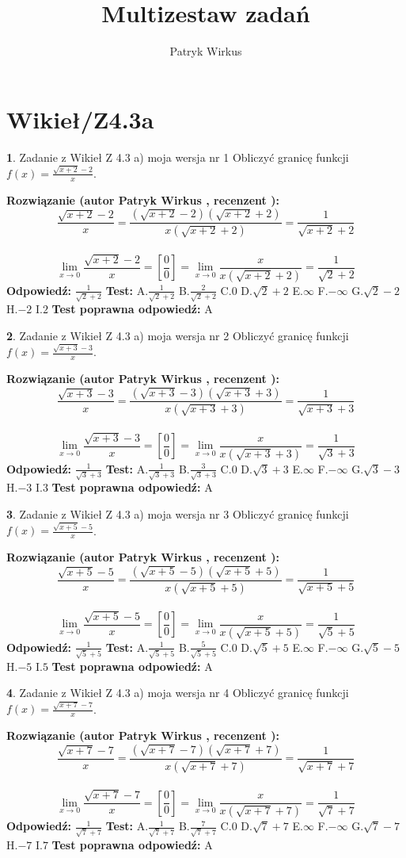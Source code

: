\documentclass[12pt, a4paper]{article}
\title{Multizestaw zadań}
\author{Patryk Wirkus}
\date{}
\theoremstyle{definition} %
\newtheorem{zad}{}
\newcommand{\kategoria}[1]{\section{#1}}
\newcommand{\zadStart}[1]{\begin{zad}#1\newline}
\newcommand{\zadStop}{\end{zad}}
\newcommand{\rozwStart}[2]{\noindent \textbf{Rozwiązanie (autor #1 , recenzent #2): }\newline}
\newcommand{\rozwStop}{\newline}
\newcommand{\odpStart}{\noindent \textbf{Odpowiedź:}\newline}
\newcommand{\odpStop}{\newline}
\newcommand{\testStart}{\noindent \textbf{Test:}\newline}
\newcommand{\testStop}{\newline}
\newcommand{\kluczStart}{\noindent \textbf{Test poprawna odpowiedź:}\newline}
\newcommand{\kluczStop}{\newline}
\begin{document}
\maketitle

\kategoria{Wikieł/Z4.3a}


\zadStart{Zadanie z Wikieł Z 4.3 a) moja wersja nr 1}
Obliczyć granicę funkcji $f(x)=\frac{\sqrt{x+2}-2}{x}$.
\zadStop
\rozwStart{Patryk Wirkus}{}
$$\frac{\sqrt{x+2}-2}{x}=\frac{(\sqrt{x+2}-2)(\sqrt{x+2}+2)}{x(\sqrt{x+2}+2)}=\frac{1}{\sqrt{x+2}+2}$$
\\
$$\lim\limits_{x\to0}\frac{\sqrt{x+2}-2}{x}=[\frac{0}{0}]=
\lim\limits_{x\to0}\frac{x}{x(\sqrt{x+2}+2)} = \frac{1}{\sqrt{2}+2}$$
\rozwStop
\odpStart
$\frac{1}{\sqrt{2}+2}$
\odpStop
\testStart
A.$\frac{1}{\sqrt{2}+2}$
B.$\frac{2}{\sqrt{2}+2}$
C.$0$
D.$\sqrt{2}+2$
E.$\infty$
F.$-\infty$
G.$\sqrt{2}-2$
H.$-2$
I.$2$
\testStop
\kluczStart
A
\kluczStop



\zadStart{Zadanie z Wikieł Z 4.3 a) moja wersja nr 2}
Obliczyć granicę funkcji $f(x)=\frac{\sqrt{x+3}-3}{x}$.
\zadStop
\rozwStart{Patryk Wirkus}{}
$$\frac{\sqrt{x+3}-3}{x}=\frac{(\sqrt{x+3}-3)(\sqrt{x+3}+3)}{x(\sqrt{x+3}+3)}=\frac{1}{\sqrt{x+3}+3}$$
\\
$$\lim\limits_{x\to0}\frac{\sqrt{x+3}-3}{x}=[\frac{0}{0}]=
\lim\limits_{x\to0}\frac{x}{x(\sqrt{x+3}+3)} = \frac{1}{\sqrt{3}+3}$$
\rozwStop
\odpStart
$\frac{1}{\sqrt{3}+3}$
\odpStop
\testStart
A.$\frac{1}{\sqrt{3}+3}$
B.$\frac{3}{\sqrt{3}+3}$
C.$0$
D.$\sqrt{3}+3$
E.$\infty$
F.$-\infty$
G.$\sqrt{3}-3$
H.$-3$
I.$3$
\testStop
\kluczStart
A
\kluczStop



\zadStart{Zadanie z Wikieł Z 4.3 a) moja wersja nr 3}
Obliczyć granicę funkcji $f(x)=\frac{\sqrt{x+5}-5}{x}$.
\zadStop
\rozwStart{Patryk Wirkus}{}
$$\frac{\sqrt{x+5}-5}{x}=\frac{(\sqrt{x+5}-5)(\sqrt{x+5}+5)}{x(\sqrt{x+5}+5)}=\frac{1}{\sqrt{x+5}+5}$$
\\
$$\lim\limits_{x\to0}\frac{\sqrt{x+5}-5}{x}=[\frac{0}{0}]=
\lim\limits_{x\to0}\frac{x}{x(\sqrt{x+5}+5)} = \frac{1}{\sqrt{5}+5}$$
\rozwStop
\odpStart
$\frac{1}{\sqrt{5}+5}$
\odpStop
\testStart
A.$\frac{1}{\sqrt{5}+5}$
B.$\frac{5}{\sqrt{5}+5}$
C.$0$
D.$\sqrt{5}+5$
E.$\infty$
F.$-\infty$
G.$\sqrt{5}-5$
H.$-5$
I.$5$
\testStop
\kluczStart
A
\kluczStop



\zadStart{Zadanie z Wikieł Z 4.3 a) moja wersja nr 4}
Obliczyć granicę funkcji $f(x)=\frac{\sqrt{x+7}-7}{x}$.
\zadStop
\rozwStart{Patryk Wirkus}{}
$$\frac{\sqrt{x+7}-7}{x}=\frac{(\sqrt{x+7}-7)(\sqrt{x+7}+7)}{x(\sqrt{x+7}+7)}=\frac{1}{\sqrt{x+7}+7}$$
\\
$$\lim\limits_{x\to0}\frac{\sqrt{x+7}-7}{x}=[\frac{0}{0}]=
\lim\limits_{x\to0}\frac{x}{x(\sqrt{x+7}+7)} = \frac{1}{\sqrt{7}+7}$$
\rozwStop
\odpStart
$\frac{1}{\sqrt{7}+7}$
\odpStop
\testStart
A.$\frac{1}{\sqrt{7}+7}$
B.$\frac{7}{\sqrt{7}+7}$
C.$0$
D.$\sqrt{7}+7$
E.$\infty$
F.$-\infty$
G.$\sqrt{7}-7$
H.$-7$
I.$7$
\testStop
\kluczStart
A
\kluczStop
\end{document}
